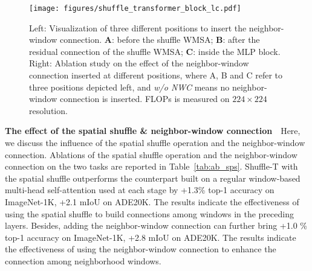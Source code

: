\documentclass{article}
\begin{document}
\begin{figure}
\begin{minipage}[b]{0.49\textwidth}
\centering
\texttt{[image: figures/shuffle\_transformer\_block\_lc.pdf]}
\end{minipage}
\begin{minipage}[b]{0.49\textwidth}
\centering
{}
\end{minipage}
\caption{Left: Visualization of three different positions to insert the neighbor-window connection. \textbf{A}: before the shuffle WMSA; \textbf{B}: after the residual connection of the shuffle WMSA; \textbf{C}: inside the MLP block. Right: Ablation study on the effect of the neighbor-window connection inserted at different positions, where A, B and C refer to three positions depicted left, and \textit{w/o NWC} means no neighbor-window connection is inserted. FLOPs is measured on $224\times224$ resolution.}
\label{fig:my_label}
\vspace{-3mm}
\end{figure}

\textbf{The effect of the spatial shuffle \& neighbor-window connection}~~Here, we discuss the influence of the spatial shuffle operation and the neighbor-window connection. Ablations of the spatial shuffle operation and the neighbor-window connection on the two tasks are reported in Table~\ref{tab:ab_sps}. Shuffle-T
with the spatial shuffle outperforms the counterpart built on a regular window-based multi-head self-attention used at each stage by +1.3\% top-1 accuracy on ImageNet-1K, +2.1 mIoU on ADE20K. The results indicate the effectiveness of using the spatial shuffle to build connections among windows in the preceding layers. Besides, adding the neighbor-window connection can further bring +1.0 \% top-1 accuracy on ImageNet-1K, +2.8 mIoU on ADE20K. The results indicate the effectiveness of using the neighbor-window connection to enhance the connection among neighborhood windows.
\end{document}

